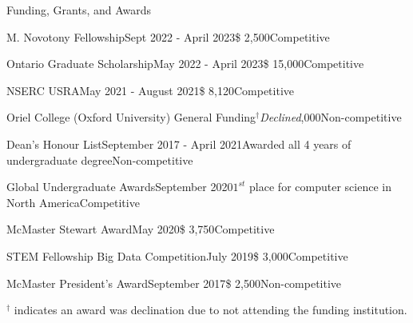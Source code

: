 \begin{rSection}{Funding, Grants, and Awards} 

\begin{aSubsection}{M. Novotony Fellowship}{Sept 2022 - April 2023}{\$ 2,500}{Competitive}
\end{aSubsection}

\begin{aSubsection}{Ontario Graduate Scholarship}{May 2022 - April 2023}{\$ 15,000}{Competitive}
\end{aSubsection}

\begin{aSubsection}{NSERC USRA}{May 2021 - August 2021}{\$ 8,120}{Competitive}
\end{aSubsection}

\begin{aSubsection}{Oriel College (Oxford University) General Funding}{$^\dagger$\emph{Declined}}{,000}{Non-competitive}
\end{aSubsection}

\begin{aSubsection}{Dean's Honour List}{September 2017 - April 2021}{Awarded all 4 years of undergraduate degree}{Non-competitive}
\end{aSubsection}

\begin{aSubsection}{Global Undergraduate Awards}{September 2020}{$1^{st}$ place for computer science in North America}{Competitive}
\end{aSubsection}

\begin{aSubsection}{McMaster Stewart Award}{May 2020}{\$ 3,750}{Competitive}
\end{aSubsection}


\begin{aSubsection}{STEM Fellowship Big Data Competition}{July 2019}{\$ 3,000}{Competitive}
\end{aSubsection}

\begin{aSubsection}{McMaster President's Award}{September 2017}{\$ 2,500}{Non-competitive}
\end{aSubsection}

\smallskip
$^\dagger$ indicates an award was declination due to not attending the funding institution.

\end{rSection}


